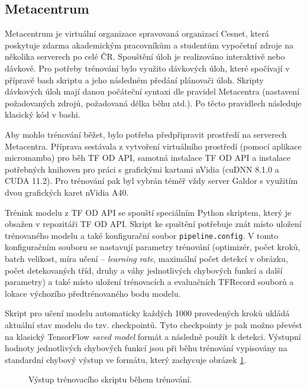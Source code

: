 \subsection*{Metacentrum}
Metacentrum je virtuální organizace spravovaná organizací Cesnet, která poskytuje zdarma akademickým pracovníkům a studentům vypočetní zdroje na několika serverech po celé ČR. Spouštění úloh je realizováno interaktivě nebo dávkově. Pro potřeby trénování bylo využito dávkových úloh, které spočívají v přípravě bash skriptu a jeho následném předání plánovači úloh. Skripty dávkových úloh mají danou počáteční syntaxi dle pravidel Metacentra (nastavení požadovaných zdrojů, požadovaná délka běhu atd.). Po těcto pravidlech následuje klasický kód v bashi.

Aby mohlo trénování běžet, bylo potřeba předpřipravit prostředí na serverech Metacentra. Příprava sestávala z vytvoření virtuálního prostředí (pomocí aplikace micromamba) pro běh TF OD API, samotná instalace TF OD API a instalace potřebných knihoven pro práci s grafickými kartami nVidia (cuDNN 8.1.0 a CUDA 11.2). Pro trénování pak byl vybrán téměř vždy server Galdor s využitím dvou grafických karet nVidia A40.

Trénink modelu z TF OD API se spouští speciálním Python skriptem, který je obsažen v repozitáři TF OD API. Skript ke spuštění potřebuje znát místo uložení trénovaného modelu a také konfigurační soubor \texttt{pipeline.config}. V tomto konfiguračním souboru se nastavují parametry trénování (optimizér, počet kroků, batch velikost, míra učení -- \emph{learning rate}, maximální počet detekcí v obrázku, počet detekovaných tříd, druhy a váhy jednotlivých chybových funkcí a další parametry) a také místo uložení trénovacích a evaluačních TFRecord souborů a lokace výchozího předtrénovaného bodu modelu.

Skript pro učení modelu automaticky každých 1000 provedených kroků ukládá aktuální stav modelu do tzv. checkpointů. Tyto checkpointy je pak možno převést na klasický TensorFlow \emph{saved model} formát a následně použít k detekci. Výstupní hodnoty jednotlivých chybových funkcí jsou při běhu trénování vypisovány na standardní chybový výstup ve formátu, který zachycuje obrázek \ref{obrazek:trenovani}.

\begin{figure}[H]
  \begin{center}
  \label{obrazek:trenovani}
  \caption{Výstup trénovacího skriptu během trénování.}
  \end{center}
\end{figure}

